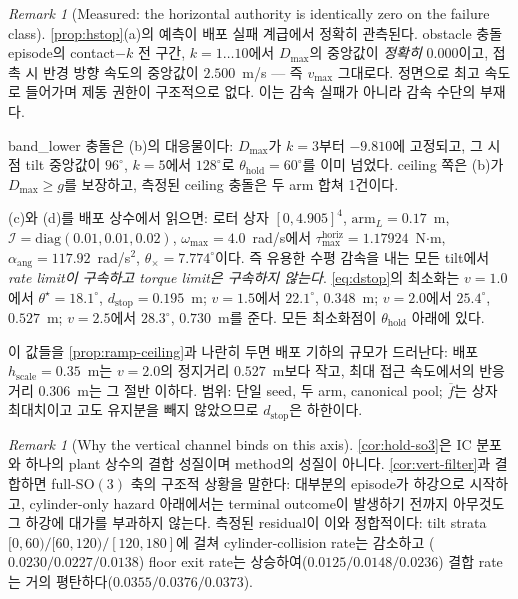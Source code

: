 \documentclass[11pt]{article}
\theoremstyle{plain}
\theoremstyle{definition}
\theoremstyle{remark}
\newtheorem{remark}[theorem]{Remark}
\newcommand{\SO}{\mathrm{SO}}
\newcommand{\inertia}{\mathcal I}
\begin{document}
\begin{remark}[Measured: the horizontal authority is identically zero on the failure class]\label{rem:dmax-measured}
\cref{prop:hstop}(a)의 예측이 배포 실패 계급에서 정확히 관측된다. obstacle 충돌 episode의
contact$-k$ 전 구간, $k=1\ldots10$에서 $D_{\max}$의 중앙값이 \emph{정확히} $0.000$이고, 접촉 시
반경 방향 속도의 중앙값이 $2.500$~m/s --- 즉 $v_{\max}$ 그대로다. 정면으로 최고 속도로 들어가며
제동 권한이 구조적으로 없다. 이는 감속 실패가 아니라 감속 수단의 부재다.

band\_lower 충돌은 (b)의 대응물이다: $D_{\max}$가 $k=3$부터 $-9.810$에 고정되고, 그 시점 tilt
중앙값이 $96^\circ$, $k=5$에서 $128^\circ$로 $\theta_{\mathrm{hold}}=60^\circ$를 이미 넘었다.
ceiling 쪽은 (b)가 $D_{\max}\ge g$를 보장하고, 측정된 ceiling 충돌은 두 arm 합쳐 1건이다.

(c)와 (d)를 배포 상수에서 읽으면: 로터 상자 $[0,4.905]^4$, $\mathrm{arm}_L=0.17$~m,
$\inertia=\mathrm{diag}(0.01,0.01,0.02)$, $\omega_{\max}=4.0$~rad/s에서
$\tau^{\mathrm{horiz}}_{\max}=1.17924$~N$\cdot$m, $\alpha_{\mathrm{ang}}=117.92$~rad/s$^2$,
$\theta_\times=7.774^\circ$이다. 즉 유용한 수평 감속을 내는 모든 tilt에서 \emph{rate limit이
구속하고 torque limit은 구속하지 않는다}. \cref{eq:dstop}의 최소화는
$v=1.0$에서 $\theta^\star=18.1^\circ$, $d_{\mathrm{stop}}=0.195$~m;
$v=1.5$에서 $22.1^\circ$, $0.348$~m;
$v=2.0$에서 $25.4^\circ$, $0.527$~m;
$v=2.5$에서 $28.3^\circ$, $0.730$~m를 준다. 모든 최소화점이 $\theta_{\mathrm{hold}}$ 아래에 있다.

이 값들을 \cref{prop:ramp-ceiling}과 나란히 두면 배포 기하의 규모가 드러난다: 배포
$h_{\mathrm{scale}}=0.35$~m는 $v=2.0$의 정지거리 $0.527$~m보다 작고, 최대 접근 속도에서의 반응
거리 $0.306$~m는 그 절반 이하다. 범위: 단일 seed, 두 arm, canonical pool; $\overline f$는 상자
최대치이고 고도 유지분을 빼지 않았으므로 $d_{\mathrm{stop}}$은 하한이다.
\end{remark}

\begin{remark}[Why the vertical channel binds on this axis]\label{rem:hold-bind}
\cref{cor:hold-so3}은 IC 분포와 하나의 plant 상수의 결합 성질이며 method의 성질이 아니다.
\cref{cor:vert-filter}과 결합하면 full-$\SO(3)$ 축의 구조적 상황을 말한다: 대부분의 episode가
하강으로 시작하고, cylinder-only hazard 아래에서는 terminal outcome이 발생하기 전까지 아무것도 그
하강에 대가를 부과하지 않는다. 측정된 residual이 이와 정합적이다: tilt strata
$[0,60)/[60,120)/[120,180]$에 걸쳐 cylinder-collision rate는 감소하고
($0.0230/0.0227/0.0138$) floor exit rate는 상승하여($0.0125/0.0148/0.0236$) 결합 rate는 거의
평탄하다($0.0355/0.0376/0.0373$).
\end{remark}
\end{document}
